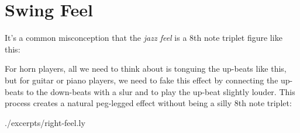 \section{Swing Feel}
It's a common misconception that the \emph{jazz feel} is a 8th note triplet figure like this:


For horn players, all we need to think about is tonguing the up-beats like this, but for guitar or piano players, we need to fake this effect by connecting the up-beats to the down-beats with a slur and to play the up-beat slightly louder. This process creates a natural peg-legged effect without being a silly 8th note triplet:

 {./excerpts/right-feel.ly}
